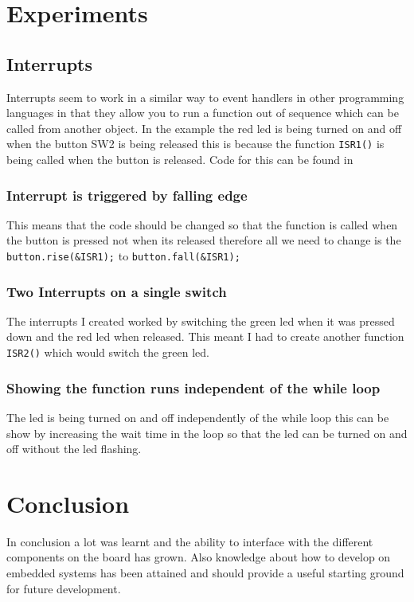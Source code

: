 \documentclass[a4paper,12pt]{scrartcl}
\begin{document}
	\section{Experiments}
	{
		\subsection{Interrupts}
		{
			Interrupts seem to work in a similar way to event handlers in other programming languages in that they allow you to run a function out of sequence which can be called from another object. In the example the red led is being turned on and off when the button SW2 is being released this is because the function \lstinline|ISR1()| is being called when the button is released. Code for this can be found in 
			\subsubsection{Interrupt is triggered by falling edge}
			{
				This means that the code should be changed so that the function is called when the button is pressed not when its released therefore all we need to change is the \lstinline|button.rise(&ISR1);| to \lstinline|button.fall(&ISR1);|
			}
			\subsubsection{Two Interrupts on a single switch}
			{
				The interrupts I created worked by switching the green led when it was pressed down and the red led when released. This meant I had to create another function \lstinline|ISR2()| which would switch the green led.
			}
			
			\subsubsection{Showing the function runs independent of the while loop}
			{
				The led is being turned on and off independently of the while loop this can be show by increasing the wait time in the loop so that the led can be turned on and off without the led flashing.
			}

		}

	}

	\section{Conclusion}
	{
		In conclusion a lot was learnt and the ability to interface with the different components on the board has grown. Also knowledge about how to develop on embedded systems has been attained and should provide a useful starting ground for future development.
	}
	
	\newpage
	
	\printbibliography[heading=bibintoc,title=References]
\end{document}
